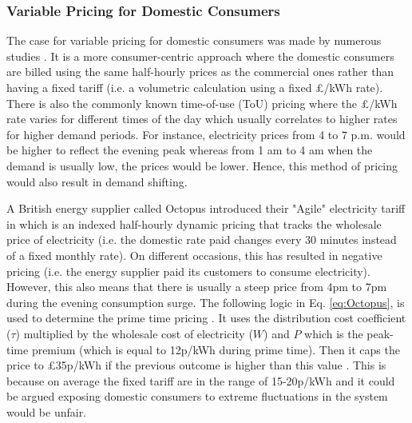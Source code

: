 \documentclass[energies,article,submit,moreauthors,pdftex]{Definitions/mdpi}
\begin{document}



\subsubsection{Variable Pricing for Domestic Consumers}
The case for variable pricing for domestic consumers was made by numerous studies \cite{REF!}. It is a more consumer-centric approach where the domestic consumers are billed using the same half-hourly prices as the commercial ones rather than having a fixed tariff (i.e. a volumetric calculation using a fixed £/kWh rate). There is also the commonly known time-of-use (ToU) pricing where the £/kWh rate varies for different times of the day which usually correlates to higher rates for higher demand periods. For instance, electricity prices from 4 to 7 p.m. would be higher to reflect the evening peak whereas from 1 am to 4 am when the demand is usually low, the prices would be lower. Hence, this method of pricing would also result in demand shifting.

A British energy supplier called Octopus \cite{AgileEnergy} introduced their "Agile" electricity tariff in which is an indexed half-hourly dynamic pricing that tracks the wholesale price of electricity (i.e. the domestic rate paid changes every 30 minutes instead of a fixed monthly rate). On different occasions, this has resulted in negative pricing (i.e. the energy supplier paid its customers to consume electricity). However, this also means that there is usually a steep price from 4pm to 7pm during the evening consumption surge. The following logic in Eq. \ref{eq:Octopus}, is used to determine the prime time pricing \cite{AgileEnergyb}. It uses the distribution cost coefficient ($\tau$) multiplied by the wholesale cost of electricity ($W$) and $P$ which is the peak-time premium (which is equal to 12p/kWh during prime time). Then it caps the price to £35p/kWh if the previous outcome is higher than this value \cite{AgileEnergyb}. This is because on average the fixed tariff are in the range of 15-20p/kWh and it could be argued exposing domestic consumers to extreme fluctuations in the system would be unfair.
\end{document}
